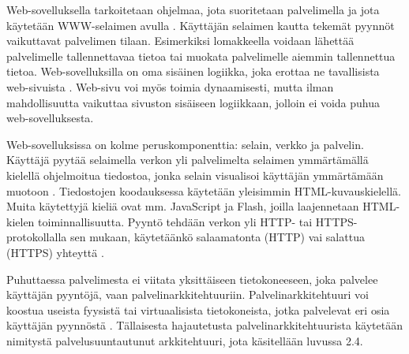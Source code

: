 Web-sovelluksella tarkoitetaan ohjelmaa, jota suoritetaan palvelimella ja jota käytetään WWW-selaimen avulla \cite{uml}. Käyttäjän selaimen kautta tekemät pyynnöt vaikuttavat palvelimen tilaan. Esimerkiksi lomakkeella voidaan lähettää palvelimelle tallennettavaa tietoa tai muokata palvelimelle aiemmin tallennettua tietoa. Web-sovelluksilla on oma sisäinen logiikka, joka erottaa ne tavallisista web-sivuista \cite{uml}. Web-sivu voi myös toimia dynaamisesti, mutta ilman mahdollisuutta vaikuttaa sivuston sisäiseen logiikkaan, jolloin ei voida puhua web-sovelluksesta.

Web-sovelluksissa on kolme peruskomponenttia: selain, verkko ja palvelin. Käyttäjä pyytää selaimella verkon yli palvelimelta selaimen ymmärtämällä kielellä ohjelmoitua tiedostoa, jonka selain visualisoi käyttäjän ymmärtämään muotoon \cite{uml}. Tiedostojen koodauksessa käytetään yleisimmin HTML-kuvauskielellä. Muita käytettyjä kieliä ovat mm. JavaScript ja Flash, joilla laajennetaan HTML-kielen toiminnallisuutta. Pyyntö tehdään verkon yli HTTP- tai HTTPS-protokollalla sen mukaan, käytetäänkö salaamatonta (HTTP) vai salattua (HTTPS) yhteyttä \cite{rfc2818}.

Puhuttaessa palvelimesta ei viitata yksittäiseen tietokoneeseen, joka palvelee käyttäjän pyyntöjä, vaan palvelinarkkitehtuuriin. Palvelinarkkitehtuuri voi koostua useista fyysistä tai virtuaalisista tietokoneista, jotka palvelevat eri osia käyttäjän pyynnöstä \cite{soa}. Tällaisesta hajautetusta palvelinarkkitehtuurista käytetään nimitystä palvelusuuntautunut arkkitehtuuri, jota käsitellään luvussa 2.4.